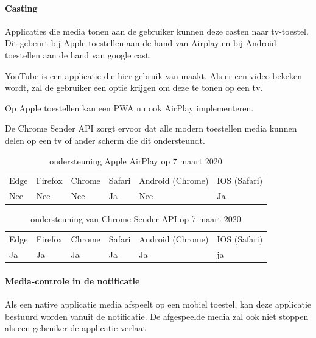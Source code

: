 \paragraph{Casting}

Applicaties die media tonen aan de gebruiker kunnen deze casten naar tv-toestel. Dit gebeurt bij Apple toestellen aan de hand van Airplay en bij Android toestellen aan de hand van google cast.


YouTube is een applicatie die hier gebruik van maakt. Als er een video bekeken wordt, zal de gebruiker een optie krijgen om deze te tonen op een tv.


Op Apple toestellen kan een PWA nu ook AirPlay implementeren. 

\autocite{Apple2020a}


De Chrome Sender API \autocite{Developers2020b} zorgt ervoor dat alle modern toestellen media kunnen delen op een tv of ander scherm die dit ondersteundt.

\begin{table}[H]
	\centering
	\begin{tabular}{llllll}
		Edge & Firefox & Chrome & Safari & Android (Chrome) & IOS (Safari) \\
		Nee   & Nee      & Nee     & Ja     & Nee               & Ja          
	\end{tabular}	
	\caption{ondersteuning Apple AirPlay op 7 maart 2020}
\end{table}
\begin{table}[H]
	\centering
	\begin{tabular}{llllll}
		Edge & Firefox & Chrome & Safari & Android (Chrome) & IOS (Safari) \\
		Ja   & Ja      & Ja     & Ja     & Ja               & ja          
	\end{tabular}	
	\caption{ondersteuning van Chrome Sender API op 7 maart 2020}
\end{table}




\paragraph{Media-controle in de notificatie }


Als een native applicatie media afspeelt op een mobiel toestel, kan deze applicatie bestuurd worden vanuit de notificatie. De afgespeelde media zal ook niet stoppen als een gebruiker de applicatie verlaat

